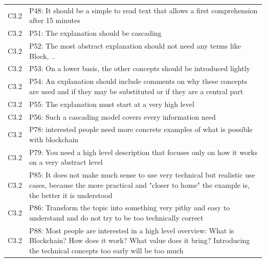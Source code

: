 \begin{table}[H]
\begin{tabularx}{\textwidth}{l|X}
	C3.2 & P48: It should be a simple to read text that allows a first comprehension after 15 minutes \\  
	C3.2 & P51: The explanation should be cascading \\  
	C3.2 & P52: The most abstract explanation should not need any terms like Block, .. \\  
	C3.2 & P53: On a lower basis, the other concepts should be introduced lightly \\  
	C3.2 & P54: An explanation should include comments on why these concepts are used and if they may be substituted or if they are a central part \\  
	C3.2 & P55: The explanation must start at a very high level \\  
	C3.2 & P56: Such a cascading model covers every information need \\  
	C3.2 & P78: interested people need more concrete examples of what is possible with blockchain \\  
	C3.2 & P79: You need a high level description that focuses only on how it works on a very abstract level \\  
	C3.2 & P85: It does not make much sense to use very technical but realistic use cases, because the more practical and "closer to home" the example is, the better it is understood \\  
	C3.2 & P86: Transform the topic into something very pithy and easy to understand and do not try to be too technically correct \\  
	C3.2 & P88: Most people are interested in a high level overview: What is Blockchain? How does it work? What value does it bring? Introducing the technical concepts too early will be too much \\  
    \end{tabularx}
\end{table}

